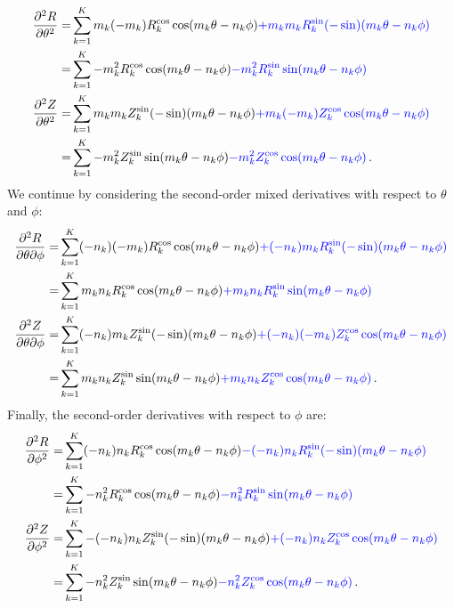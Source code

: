 \begin{align}
     \frac{\partial^2 R}{\partial \theta^2}
  =& \sum_{k=1}^{K}   m_k(-m_k)  R_k^\mathrm{cos}   \cos (m_k \theta - n_k \phi) {\color{blue} + m_k   m_k  R_k^\mathrm{sin} (-\sin)(m_k \theta - n_k \phi) } \nonumber \\
  =& \sum_{k=1}^{K}  -m_k^2      R_k^\mathrm{cos}   \cos (m_k \theta - n_k \phi) {\color{blue} - m_k^2      R_k^\mathrm{sin}   \sin (m_k \theta - n_k \phi) } \label{eqn:d2Rdt2} \\
     \frac{\partial^2 Z}{\partial \theta^2}
  =& \sum_{k=1}^{K}   m_k m_k    Z_k^\mathrm{sin} (-\sin)(m_k \theta - n_k \phi) {\color{blue} + m_k (-m_k) Z_k^\mathrm{cos}   \cos (m_k \theta - n_k \phi) } \nonumber \\
  =& \sum_{k=1}^{K}  -m_k^2      Z_k^\mathrm{sin}   \sin (m_k \theta - n_k \phi) {\color{blue} - m_k^2      Z_k^\mathrm{cos}   \cos (m_k \theta - n_k \phi) } \label{eqn:d2Zdt2} \, .
\end{align}
We continue by considering the second-order mixed derivatives with respect to $\theta$ and $\phi$:
\begin{align}
     \frac{\partial^2 R}{\partial \theta \partial \phi}
  =& \sum_{k=1}^{K} (-n_k)(-m_k) R_k^\mathrm{cos}   \cos (m_k \theta - n_k \phi) {\color{blue} + (-n_k) m_k  R_k^\mathrm{sin} (-\sin)(m_k \theta - n_k \phi) } \nonumber \\
  =& \sum_{k=1}^{K}   m_k   n_k  R_k^\mathrm{cos}   \cos (m_k \theta - n_k \phi) {\color{blue} +   m_k   n_k  R_k^\mathrm{sin}   \sin (m_k \theta - n_k \phi) } \label{eqn:d2Rdtdp} \\
     \frac{\partial^2 Z}{\partial \theta \partial \phi}
  =& \sum_{k=1}^{K} (-n_k) m_k   Z_k^\mathrm{sin} (-\sin)(m_k \theta - n_k \phi) {\color{blue} + (-n_k)(-m_k) Z_k^\mathrm{cos}   \cos (m_k \theta - n_k \phi) } \nonumber \\
  =& \sum_{k=1}^{K}   m_k  n_k   Z_k^\mathrm{sin}   \sin (m_k \theta - n_k \phi) {\color{blue} +   m_k   n_k  Z_k^\mathrm{cos}   \cos (m_k \theta - n_k \phi) } \label{eqn:d2Zdtdp} \, .
\end{align}
Finally, the second-order derivatives with respect to $\phi$ are:
\begin{align}
     \frac{\partial^2 R}{\partial \phi^2}
  =& \sum_{k=1}^{K} (-n_k) n_k  R_k^\mathrm{cos}    \cos  (m_k \theta - n_k \phi) {\color{blue} - (-n_k) n_k R_k^\mathrm{sin} (-\sin) (m_k \theta - n_k \phi) } \nonumber \\
  =& \sum_{k=1}^{K}  -n_k^2     R_k^\mathrm{cos}    \cos  (m_k \theta - n_k \phi) {\color{blue} -   n_k^2    R_k^\mathrm{sin}   \sin  (m_k \theta - n_k \phi) } \label{eqn:d2Rdp2} \\
     \frac{\partial^2 Z}{\partial \phi^2}
  =& \sum_{k=1}^{K}-(-n_k) n_k  Z_k^\mathrm{sin}  (-\sin) (m_k \theta - n_k \phi) {\color{blue} + (-n_k) n_k Z_k^\mathrm{cos}   \cos (m_k \theta - n_k \phi) } \nonumber \\
  =& \sum_{k=1}^{K}  -n_k^2     Z_k^\mathrm{sin}    \sin  (m_k \theta - n_k \phi) {\color{blue} -   n_k^2    Z_k^\mathrm{cos}   \cos (m_k \theta - n_k \phi) } \label{eqn:d2Zdp2} \, .
\end{align}

